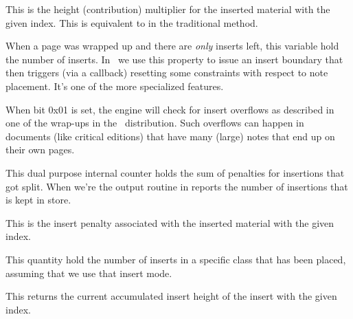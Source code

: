 \stopnewprimitive

\startnewprimitive[title={\prm {insertmultiplier}}]

This is the height (contribution) multiplier for the inserted material with the
given index. This is equivalent to  in the traditional method.

\stopnewprimitive

\startnewprimitive[title={\prm {insertonlycount}}]

When a page was wrapped up and there are {\em only} inserts left, this variable
hold the number of inserts. In \CONTEXT\ we use this property to issue an insert
boundary that then triggers (via a callback) resetting some constraints with
respect to note placement. It's one of the more specialized features.

\stopnewprimitive

\startnewprimitive[title={\prm {insertoptions}}]

When bit 0x01 is set, the engine will check for insert overflows as described in
one of the  wrap-ups in the \CONTEXT\ distribution. Such overflows
can happen in documents (like critical editions) that have many (large) notes
that end up on their own pages.

\stopnewprimitive

\startoldprimitive[title={\prm {insertpenalties}}]

This dual purpose internal counter holds the sum of penalties for insertions that
got split. When we're the output routine in reports the number of insertions that
is kept in store.

\stopoldprimitive

\startnewprimitive[title={\prm {insertpenalty}}]

This is the insert penalty associated with the inserted material with the given
index.

\stopnewprimitive

\startnewprimitive[title={\prm {insertplaced}}]

This quantity hold the number of inserts in a specific class that has been
placed, assuming that we use that insert mode.

\stopnewprimitive

\startnewprimitive[title={\prm {insertprogress}}]

This returns the current accumulated insert height of the insert with the given
index.

\stopnewprimitive

